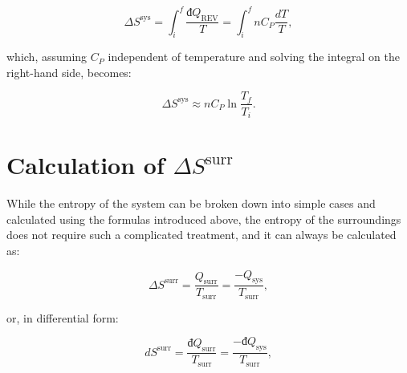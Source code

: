 \documentclass[
]{book}
\theoremstyle{definition}
\theoremstyle{definition}
\theoremstyle{definition}
\theoremstyle{remark}
\begin{document}
\begin{equation}
\Delta S^{\mathrm{sys}} = \int_i^f \frac{đQ_{\mathrm{REV}}}{T} = \int_i^f nC_P \frac{dT}{T},
\label{eq:sconstP1}
\end{equation}

which, assuming \(C_P\) independent of temperature and solving the integral on the right-hand side, becomes:

\begin{equation}
\Delta S^{\mathrm{sys}} \approx n C_P \ln \frac{T_f}{T_i}.
\label{eq:sconstP}
\end{equation}

\hypertarget{dssurr}{%
\section{\texorpdfstring{Calculation of \(\Delta S^{\mathrm{surr}}\)}{Calculation of \textbackslash Delta S\^{}\{\textbackslash mathrm\{surr\}\}}}\label{dssurr}}

While the entropy of the system can be broken down into simple cases and calculated using the formulas introduced above, the entropy of the surroundings does not require such a complicated treatment, and it can always be calculated as:

\begin{equation}
\Delta S^{\mathrm{surr}} = \frac{Q_{\text{surr}}}{T_{\text{surr}}}=\frac{-Q_{\text{sys}}}{T_{\text{surr}}},
\label{eq:dssurr}
\end{equation}

or, in differential form:

\begin{equation}
d S^{\mathrm{surr}} = \frac{đQ_{\text{surr}}}{T_{\text{surr}}}=\frac{-đQ_{\text{sys}}}{T_{\text{surr}}},
\label{eq:dssurrd}
\end{equation}
\end{document}
